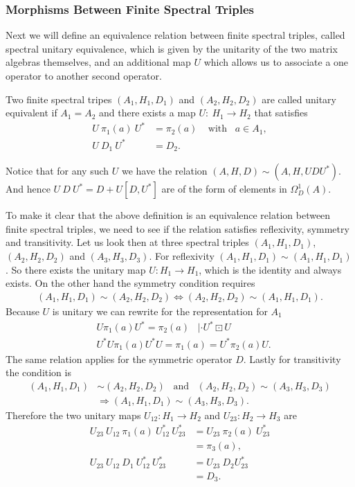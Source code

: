 \subsubsection{Morphisms Between Finite Spectral Triples}
Next we will define an equivalence relation between finite spectral triples, called
spectral unitary equivalence, which is given by the unitarity of the
two matrix algebras themselves, and an additional map $U$ which allows us to associate a
one operator to another second operator.
\begin{definition}
    Two finite spectral tripes $(A_1, H_1, D_1)$ and $(A_2, H_2, D_2)$ are
    called unitary equivalent if $A_1 = A_2$ and there exists a map $U:\ H_1
    \rightarrow H_2$ that satisfies
    \begin{align}
        U\ \pi_1(a)\ U^* &= \pi_2(a)\;\;\;\; \text{with} \;\;\; a \in A_1,\\
        U\ D_1\ U^* &= D_2.
    \end{align}
\end{definition}
Notice that for any such $U$ we have the relation $(A, H, D) \sim (A, H, UDU^*)$.
And hence $U\ D\ U^* = D + U[D, U^*]$ are of the form of elements in $\Omega _D^1 (A)$.

To make it clear that the above definition is an equivalence relation between
finite spectral triples, we need to see if the relation satisfies
reflexivity, symmetry and transitivity. Let us look then at three spectral
triples $(A_1, H_1, D_1)$, $(A_2, H_2, D_2)$ and $(A_3, H_3, D_3)$.
For reflexivity $(A_1, H_1, D_1) \sim (A_1, H_1, D_1)$. So there
exists the unitary map $U: H_1 \rightarrow H_1$, which is the identity
and always exists. On the other hand the symmetry condition requires
\begin{align}
    (A_1, H_1, D_1) \sim (A_2, H_2, D_2) \Leftrightarrow
    (A_2, H_2, D_2) \sim (A_1, H_1, D_1).
\end{align}
Because $U$ is unitary we can rewrite for the representation for $A_1$
\begin{align}
    &U\pi_1(a)U^* = \pi_2(a) \;\;\; | \cdot U^*\boxdot U\nonumber \\
    &U^*U\pi_1(a)U^*U = \pi_1(a) = U^*\pi_2(a)U.
\end{align}
The same relation applies for the symmetric operator $D$.
Lastly for transitivity the condition is
\begin{align}
    (A_1, H_1, D_1) &\sim (A_2, H_2, D_2) \;\;\; \text{and} \;\;\;
    (A_2, H_2, D_2) \sim (A_3, H_3, D_3) \nonumber\\
    &\Rightarrow (A_1, H_1, D_1) \sim (A_3, H_3, D_3).
\end{align}
Therefore the two unitary maps $U_{12}:H_1 \rightarrow H_2$ and
$U_{23}: H_2 \rightarrow H_3$ are
\begin{align}
    U_{23}\ U_{12}\ \pi_1(a)\ U^*_{12}\ U^*_{23} &= U_{23}\
    \pi_2(a)\ U_{23}^*\nonumber \\
    &= \pi_3(a), \\
    U_{23}\ U_{12}\ D_1\ U^*_{12}\ U^*_{23} &= U_{23}\
    D_2 U_{23}^* \nonumber\\
    &= D_3.
\end{align}

